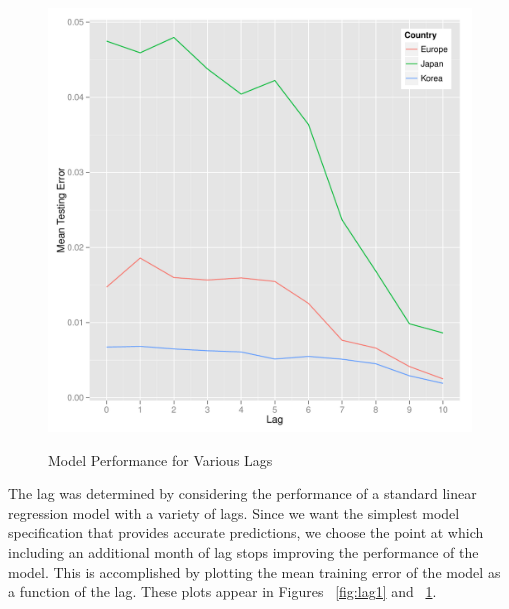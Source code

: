 \documentclass{sig-alternate-05-2015}
\begin{document}
\begin{figure}
\centering
\caption{Model Performance for Various Lags}
\includegraphics[scale=0.45]{lag2.pdf}
\label{fig:lag2}
\end{figure}

The lag was determined by considering the performance of a standard linear regression model with a variety of lags. Since we want the simplest model specification that provides accurate predictions, we choose the point at which including an additional month of lag stops improving the performance of the model. This is accomplished by plotting the mean training error of the model as a function of the lag. These plots appear in Figures ~\ref{fig:lag1} and ~\ref{fig:lag2}. 
\end{document}
